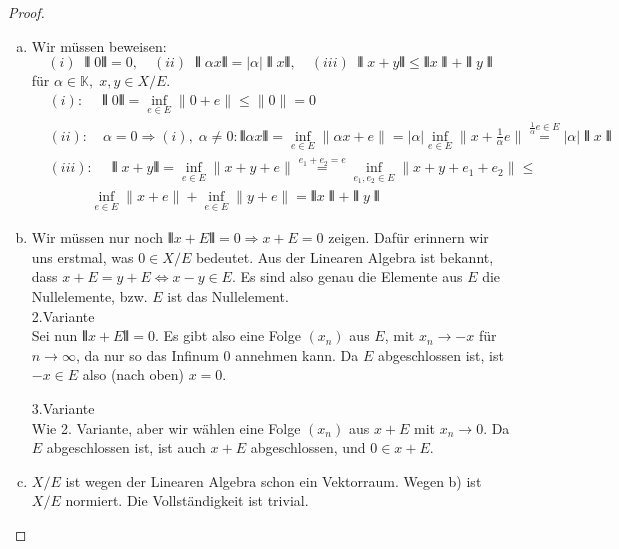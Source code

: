 \documentclass[ngerman]{article}
\theoremstyle{definition}%
\newcommand{\K}{\mathbb{K}}
\newcommand{\abs}[1]{\left\lvert #1 \right\rvert }
\newcommand{\df}{\Rightarrow} %
\newcommand{\semi}[1]{\interleave{#1}\interleave}
\renewcommand{\{ }{\left\lbrace}
\renewcommand{\}}{\right\rbrace}
\begin{document}
\begin{proof} 
	\begin{enumerate}[(a)]
	\item 
		Wir müssen beweisen: 
	$$(i)\;\semi{0} = 0,\quad(ii)\;\semi{\alpha x} = |\alpha| \semi{x},\quad (iii)\;\semi{x+y}\leq \semi{x}+\semi{y}$$
	für $\alpha \in \K,\; x,y\in X/E$.
	\begin{equation*}
		\begin{split}
		& (i):\quad \semi{0} = \inf_{e\in E}\|0+e\| \leq \|0\| = 0
		\\ & (ii):\quad  \alpha = 0\df (i),\;\alpha \not = 0: \semi{\alpha x} = \inf_{e\in E}\|\alpha x+e\| = \abs{\alpha} \inf_{e\in E}\| x+\frac{1}{\alpha} e\| \overset{\frac{1}{\alpha}e\in E}{=} |\alpha| \semi{x}
		\\ & (iii):\quad \semi{x+y} = \inf_{e\in E}\|x+y+e\| \overset{e_1+e_2=e}{=} \inf_{e_1,e_2\in E}\|x+y+e_1+e_2\| \leq \\ & \quad\quad\quad \inf_{e\in E}\|x+e\| + \inf_{e\in E}\|y+e\| = \semi{x}+ \semi{y}
		\end{split}
	\end{equation*}
	
	\item 
		Wir müssen nur noch $\semi{x+E} = 0 \df x + E = 0$ zeigen. Dafür erinnern wir uns erstmal, was $0 \in X/E$ bedeutet. Aus der Linearen Algebra ist bekannt, dass $x+E=y+E \Leftrightarrow x - y \in E$. Es sind also genau die Elemente aus $E$ die Nullelemente, bzw. $E$ ist das Nullelement.\\
	2.Variante\\
	Sei nun $\semi{x+E} = 0$. Es gibt also eine Folge $(x_n)$ aus $E$, mit $x_n \to -x$ für $n\to \infty$, da nur so das Infinum $0$ annehmen kann. Da $E$ abgeschlossen ist, ist $-x\in E$ also (nach oben) $ x = 0$.\par 
	3.Variante\\
	Wie 2. Variante, aber wir wählen eine Folge $(x_n)$ aus $x+E$ mit $x_n \to 0$. Da $E$ abgeschlossen ist, ist auch $x+E$ abgeschlossen, und $0\in x+E$.
	
	\item 
	$X/E$ ist wegen der Linearen Algebra schon ein Vektorraum. Wegen b) ist $X/E$ normiert. Die Vollständigkeit ist trivial.
	
	\end{enumerate}
\end{proof}




\end{document}
